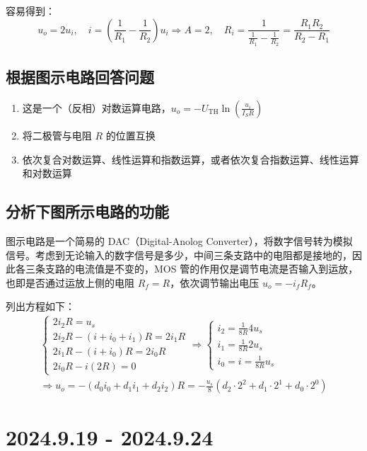 \documentclass[UTF8]{report}
\theoremstyle{MyLineTheoremStyle} %
\theoremstyle{MyBlockTheoremStyle} %
\theoremstyle{MySubsubsectionStyle} %
\begin{document}
容易得到：
\begin{equation}
u_o = 2u_i,\quad i = (\frac{1}{R_1} - \frac{1}{R_2})u_i \Longrightarrow A = 2,\quad R_{i} = \frac{1}{\frac{1}{R_1} - \frac{1}{R_2}} = \frac{R_1R_2}{R_2-R_1}
\end{equation}

\section{根据图示电路回答问题}

\begin{enumerate}[label=(\arabic*)]
\item 这是一个（反相）对数运算电路，$u_o = - U_{\text{TH}} \ln \left( \frac{u_i}{I_S R} \right)$
\item 将二极管与电阻 $R$ 的位置互换
\item 依次复合对数运算、线性运算和指数运算，或者依次复合指数运算、线性运算和对数运算
\end{enumerate}

\section{分析下图所示电路的功能}
图示电路是一个简易的 DAC（Digital-Anolog Converter），将数字信号转为模拟信号。考虑到无论输入的数字信号是多少，中间三条支路中的电阻都是接地的，因此各三条支路的电流值是不变的，MOS 管的作用仅是调节电流是否输入到运放，也即是否通过运放上侧的电阻 $R_f = R$，依次调节输出电压 $u_o = -i_fR_f$。

列出方程如下：
\begin{gather}
\begin{cases}
    2i_2R = u_s \\ 
    2i_2R - (i + i_0 + i_1)R = 2i_1R \\ 
    2i_1R - (i + i_0 )R = 2i_0R \\ 
    2i_0R - i(2R) = 0
\end{cases}
\Longrightarrow 
\begin{cases}
    i_2 = \frac{1}{8R} 4u_s \\ 
    i_1 = \frac{1}{8R} 2u_s \\ 
    i_0 = i = \frac{1}{8R} u_s
\end{cases} \\ 
\Longrightarrow 
u_o = - (d_0i_0 + d_1i_1 + d_2i_2)R = -\frac{u_s}{8}\left( d_2\cdot 2^2 + d_1\cdot 2^1 + d_0\cdot 2^0 \right)
\end{gather}

\chapter{2024.9.19 - 2024.9.24}\thispagestyle{fancy}
\end{document}

